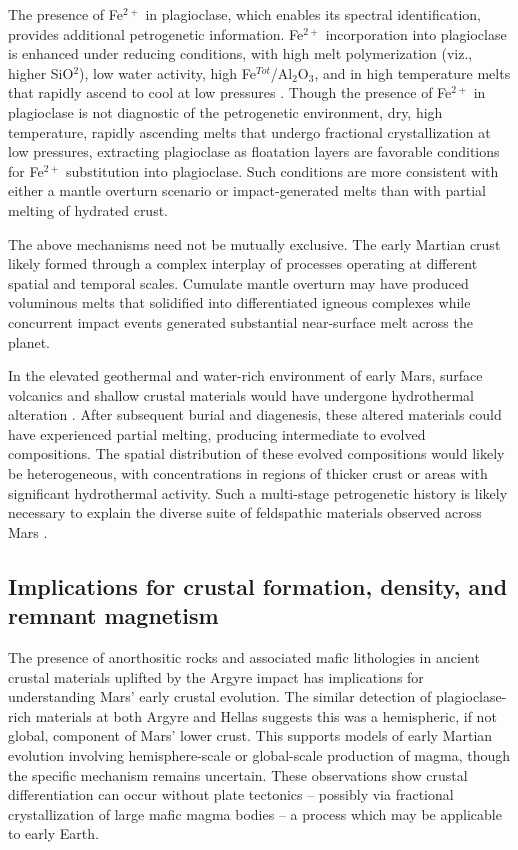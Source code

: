 \documentclass[12pt]{article}
\begin{document}
The presence of Fe$^{2+}$ in plagioclase, which enables its spectral identification, provides additional petrogenetic information. Fe$^{2+}$ incorporation into plagioclase is enhanced under reducing conditions, with high melt polymerization (viz., higher SiO$^2$), low water activity, high Fe$^{Tot}$/Al$_{2}$O$_{3}$, and in high temperature melts that rapidly ascend to cool at low pressures \citep{Wenk1973, Longhi1976, Smith1988, Phinney1992, Ashwal1993, Lundgaard2004}. Though the presence of Fe$^{2+}$ in plagioclase is not diagnostic of the petrogenetic environment, dry, high temperature, rapidly ascending melts that undergo fractional crystallization at low pressures, extracting plagioclase as floatation layers are favorable conditions for Fe$^{2+}$ substitution into plagioclase. Such conditions are more consistent with either a mantle overturn scenario or impact-generated melts than with partial melting of hydrated crust.

The above mechanisms need not be mutually exclusive. The early Martian crust likely formed through a complex interplay of processes operating at different spatial and temporal scales. Cumulate mantle overturn may have produced voluminous melts that solidified into differentiated igneous complexes while concurrent impact events generated substantial near-surface melt across the planet.

In the elevated geothermal and water-rich environment of early Mars, surface volcanics and shallow crustal materials would have undergone hydrothermal alteration \citep{Viviano2019}. After subsequent burial and diagenesis, these altered materials could have experienced partial melting, producing intermediate to evolved compositions. The spatial distribution of these evolved compositions would likely be heterogeneous, with concentrations in regions of thicker crust or areas with significant hydrothermal activity. Such a multi-stage petrogenetic history is likely necessary to explain the diverse suite of feldspathic materials observed across Mars \citep{Carter2013, Wray2013, Rogers2015, Viviano-Beck2017, Farrand2021, Payre2022, Payre2024, Phillips2022, Flahaut2023, Michalski2023}.

\subsection*{Implications for crustal formation, density, and remnant magnetism}

The presence of anorthositic rocks and associated mafic lithologies in ancient crustal materials uplifted by the Argyre impact has implications for understanding Mars' early crustal evolution. The similar detection of plagioclase-rich materials at both Argyre and Hellas \citep{Phillips2022} suggests this was a hemispheric, if not global, component of Mars' lower crust. This supports models of early Martian evolution involving hemisphere-scale or global-scale production of magma, though the specific mechanism remains uncertain. These observations show crustal differentiation can occur without plate tectonics -- possibly via fractional crystallization of large mafic magma bodies -- a process which may be applicable to early Earth.
\end{document}
